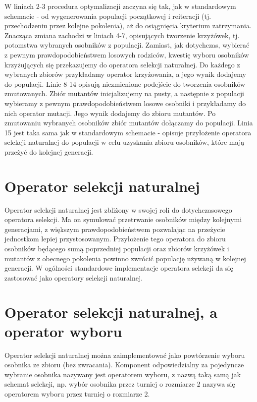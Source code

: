 \documentclass[twoside]{iisthesis}
\begin{document}
W liniach 2-3 procedura optymalizacji zaczyna się tak, jak w standardowym schemacie - od wygenerowania populacji początkowej i reiteracji (tj. przechodzeniu przez kolejne pokolenia), aż do osiągnięcia kryterium zatrzymania.
Znacząca zmiana zachodzi w liniach 4-7, opisujących tworzenie krzyżówek, tj. potomstwa wybranych osobników z populacji. Zamiast, jak dotychczas, wybierać z pewnym prawdopodobieństwem losowych rodziców, kwestię wyboru osobników krzyżujących się przekazujemy do operatora selekcji naturalnej. Do każdego z wybranych zbiorów przykładamy operator krzyżowania, a jego wynik dodajemy do populacji.
Linie 8-14 opisują niezmienione podejście do tworzenia osobników zmutowanych. Zbiór mutantów inicjalizujemy na pusty, a następnie z populacji wybieramy z pewnym prawdopodobieństwem losowe osobniki i przykładamy do nich operator mutacji. Jego wynik dodajemy do zbioru mutantów. Po zmutowaniu wybranych osobników zbiór mutantów dołączamy do populacji.
Linia 15 jest taka sama jak w standardowym schemacie - opisuje przyłożenie operatora selekcji naturalnej do populacji w celu uzyskania zbioru osobników, które mają przeżyć do kolejnej generacji.


\section{Operator selekcji naturalnej} \label{section_natSel}

Operator selekcji naturalnej jest zbliżony w swojej roli do dotychczasowego operatora selekcji. Ma on symulować przetrwanie osobników między kolejnymi generacjami, z większym prawdopodobieństwem pozwalając na przeżycie jednostkom lepiej przystosowanym. Przyłożenie tego operatora do zbioru osobników będącego sumą poprzedniej populacji oraz zbiorów krzyżówek i mutantów z obecnego pokolenia powinno zwrócić populację używaną w kolejnej generacji. W ogólności standardowe implementacje operatora selekcji da się zastosować jako operatory selekcji naturalnej.

\section{Operator selekcji naturalnej, a operator wyboru} \label{section_chooseOperator}

Operator selekcji naturalnej można zaimplementować jako powtórzenie wyboru osobnika ze zbioru (bez zwracania). Komponent odpowiedzialny za pojedyncze wybranie osobnika nazywany jest operatorem wyboru, z nazwą taką samą jak schemat selekcji, np. wybór osobnika przez turniej o rozmiarze 2 nazywa się operatorem wyboru przez turniej o rozmiarze 2.
\end{document}
